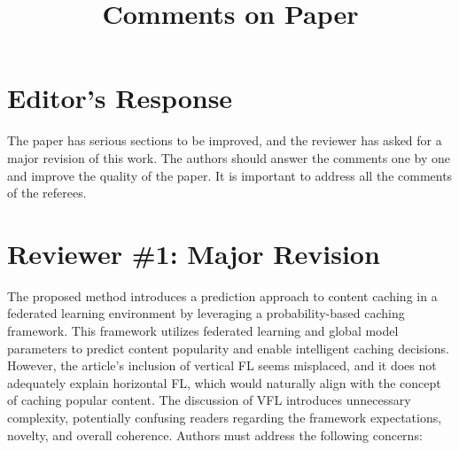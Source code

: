 \documentclass[a4paper,12pt]{article}
\title{Comments on Paper}
\author{}
\date{}
\begin{document}
\maketitle

\section*{Editor's Response}

The paper has serious sections to be improved, and the reviewer has asked for a major revision of this work. The authors should answer the comments one by one and improve the quality of the paper. It is important to address all the comments of the referees.

\section*{Reviewer \#1: Major Revision}

The proposed method introduces a prediction approach to content caching in a federated learning environment by leveraging a probability-based caching framework. This framework utilizes federated learning and global model parameters to predict content popularity and enable intelligent caching decisions. However, the article's inclusion of vertical FL seems misplaced, and it does not adequately explain horizontal FL, which would naturally align with the concept of caching popular content. The discussion of VFL introduces unnecessary complexity, potentially confusing readers regarding the framework expectations, novelty, and overall coherence. Authors must address the following concerns:
\end{document}
